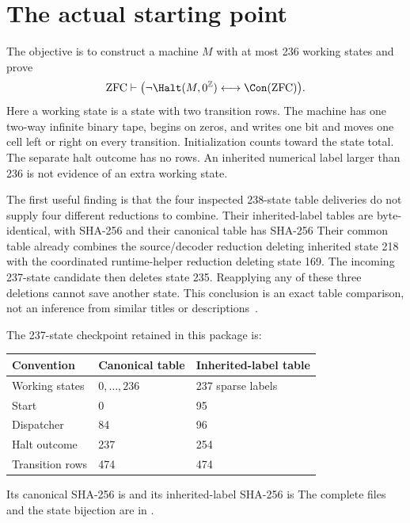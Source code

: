 \section{The actual starting point}
\label{sec:audit}

The objective is to construct a machine $M$ with at most 236 working
states and prove
\[
 \mathrm{ZFC}\vdash
 \bigl(\neg\Halt(M,0^{\mathbb Z})
           \longleftrightarrow\Con(\mathrm{ZFC})\bigr).
\]
Here a working state is a state with two transition rows.  The machine
has one two-way infinite binary tape, begins on zeros, and writes one
bit and moves one cell left or right on every transition.  Initialization
counts toward the state total.  The separate halt outcome has no rows.
An inherited numerical label larger than 236 is not evidence of an
extra working state.

The first useful finding is that the four inspected 238-state table
deliveries do not supply four different reductions to combine.  Their
inherited-label tables are byte-identical, with SHA-256
and their canonical table has SHA-256
Their common table already combines the source/decoder reduction
deleting inherited state 218 with the coordinated runtime-helper
reduction deleting state 169.  The incoming 237-state candidate then
deletes state 235.  Reapplying any of these three deletions cannot
save another state.  This conclusion is an exact table comparison,
not an inference from similar titles or descriptions~\cite{repo,parent237}.

The 237-state checkpoint retained in this package is:
\begin{center}
\begin{tabular}{@{}lll@{}}
\toprule
Convention & Canonical table & Inherited-label table\\
\midrule
Working states & $0,\ldots,236$ & 237 sparse labels\\
Start & 0 & 95\\
Dispatcher & 84 & 96\\
Halt outcome & 237 & 254\\
Transition rows & 474 & 474\\
\bottomrule
\end{tabular}
\end{center}
Its canonical SHA-256 is
and its inherited-label SHA-256 is
The complete files and the state bijection are in .

